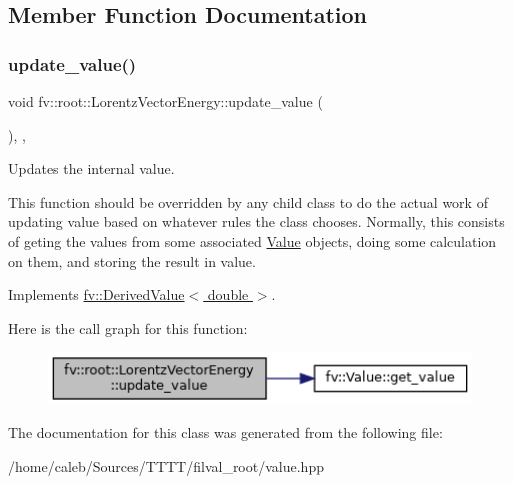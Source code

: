 \subsection{Member Function Documentation}
\hypertarget{classfv_1_1root_1_1LorentzVectorEnergy_aa69384d1af673c327daae869d5977981}{}\label{classfv_1_1root_1_1LorentzVectorEnergy_aa69384d1af673c327daae869d5977981} 
\subsubsection{\texorpdfstring{update\+\_\+value()}{update\_value()}}
{\footnotesize\ttfamily void fv\+::root\+::\+Lorentz\+Vector\+Energy\+::update\+\_\+value (\begin{DoxyParamCaption}{ }\end{DoxyParamCaption})\hspace{0.3cm}{\ttfamily [inline]}, {\ttfamily [protected]}, {\ttfamily [virtual]}}



Updates the internal value. 

This function should be overridden by any child class to do the actual work of updating value based on whatever rules the class chooses. Normally, this consists of geting the values from some associated \hyperlink{classfv_1_1Value}{Value} objects, doing some calculation on them, and storing the result in value. 

Implements \hyperlink{classfv_1_1DerivedValue_ae59e80a98eb74b95d8961bfe12ee5ec2}{fv\+::\+Derived\+Value$<$ double $>$}.

Here is the call graph for this function\+:
\nopagebreak
\begin{figure}[H]
\begin{center}
\leavevmode
\includegraphics[width=350pt]{classfv_1_1root_1_1LorentzVectorEnergy_aa69384d1af673c327daae869d5977981_cgraph}
\end{center}
\end{figure}


The documentation for this class was generated from the following file\+:\begin{DoxyCompactItemize}
\item 
/home/caleb/\+Sources/\+T\+T\+T\+T/filval\+\_\+root/value.\+hpp\end{DoxyCompactItemize}

